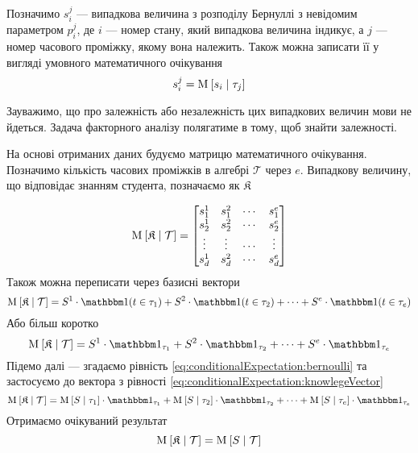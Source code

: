 Позначимо $s_i^j$ --- випадкова величина з розподілу Бернуллі з невідомим
параметром $p_i^j$, де $i$ --- номер стану, який випадкова величина індикує,
а $j$ --- номер часового проміжку, якому вона належить.
Також можна записати її у вигляді умовного математичного очікування
\begin{equation}\label{eq:conditionalExpectation:bernoulli}
  s_i^j = \operatorname{M}_{} \left[ s_i \;\middle|\; \tau_j \right]
\end{equation}

Зауважимо, що про залежність або незалежність цих випадкових величин мови не
йдеться.
Задача факторного аналізу полягатиме в тому, щоб знайти залежності.

На основі отриманих даних будуємо матрицю математичного очікування.
Позначимо кількість часових проміжків в алгебрі $\mathcal{T}$ через $e$.
Випадкову величину, що відповідає знанням студента, позначаємо як $\mathfrak{K}$

\begin{equation*}
  \operatorname{M}_{} \left[ \mathfrak{K} \;\middle|\; \mathcal{T} \right] =
  \begin{bmatrix}
    s_1^1 & s_1^2 & \cdots & s_1^e \\
    s_2^1 & s_2^2 & \cdots & s_2^e \\
    \vdots & \vdots & \cdots & \vdots \\
    s_d^1 & s_d^2 & \cdots & s_d^e \\
  \end{bmatrix}
\end{equation*}
Також можна переписати через базисні вектори
\begin{equation*}
  \Mean{\mathfrak{K} \mcond \mathcal{T}} =
  S^1 \cdot \indicator{t \in \tau_1} + S^2 \cdot \indicator{t \in \tau_2}
    + \cdots + S^e \cdot \indicator{t \in \tau_e}
\end{equation*}
Або більш коротко
\begin{equation}\label{eq:conditionalExpectation:knowlegeVector}
  \Mean{\mathfrak{K} \mcond \mathcal{T}} =
  S^1 \cdot \indicatorof{\tau_1} + S^2 \cdot \indicatorof{\tau_2}
    + \cdots + S^e \cdot \indicatorof{\tau_e}
\end{equation}
Підемо далі --- згадаємо рівність \eqref{eq:conditionalExpectation:bernoulli} та
застосуємо до вектора з рівності \eqref{eq:conditionalExpectation:knowlegeVector}
\begin{equation*}
  \Mean{\mathfrak{K} \mcond \mathcal{T}} =
  \Mean{S \mcond \tau_1} \cdot \indicatorof{\tau_1}
    + \Mean{S \mcond \tau_2} \cdot \indicatorof{\tau_2}
    + \cdots
    + \Mean{S \mcond \tau_e} \cdot \indicatorof{\tau_e}
\end{equation*}
Отримаємо очікуваний результат
\begin{equation*}
  \operatorname{M}_{} \left[ \mathfrak{K} \;\middle|\; \mathcal{T} \right] = \operatorname{M}_{} \left[ S \;\middle|\; \mathcal{T} \right]
\end{equation*}

